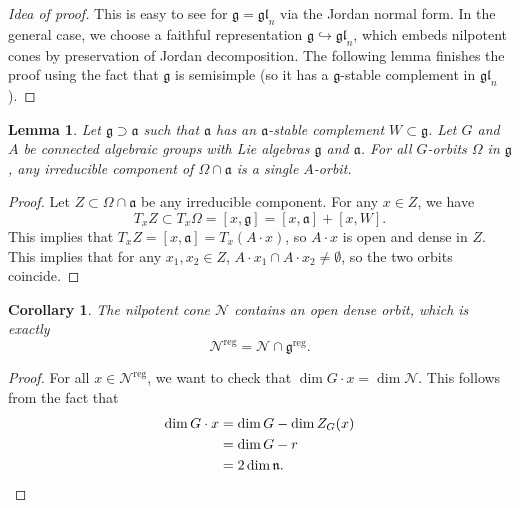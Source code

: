 \documentclass{amsart}
\newtheorem{cor}[thm]{Corollary}
\newtheorem{lem}[thm]{Lemma}
\theoremstyle{definition}
\theoremstyle{remark}
\theoremstyle{plain}
\theoremstyle{definition}
\theoremstyle{remark}
\newcommand{\g}{\mathfrak{g}}
\newcommand{\n}{\mathfrak{n}}
\newcommand{\mc}[1]{\mathcal{#1}}
\newcommand{\mf}[1]{\mathfrak{#1}}
\newcommand{\on}[1]{\operatorname{#1}}
\newcommand{\1}{\mathbf{1}}
\newcommand{\2}{\mathbf{2}}
\newcommand{\3}{\mathbf{3}}
\newcommand{\gl}{\mf{gl}}
\begin{document}
\begin{proof}[Idea of proof]
    This is easy to see for \(\g = \gl_n\) via the Jordan normal form. In the general case, we choose a faithful representation \(\g \hookrightarrow \gl_n\), which embeds nilpotent cones by preservation of Jordan decomposition. The following lemma finishes the proof using the fact that \(\g\) is semisimple (so it has a \(\g\)-stable complement in \(\gl_n\)).
\end{proof}
\begin{lem}
    Let \(\g \supset \mf{a}\) such that \(\mf{a}\) has an \(\mf{a}\)-stable complement \(W \subset \g\). Let \(G\) and \(A\) be connected algebraic groups with Lie algebras \(\g\) and \(\mf{a}\). For all \(G\)-orbits \(\Omega\) in \(\g\), any irreducible component of \(\Omega \cap \mf{a}\) is a single \(A\)-orbit.
\end{lem}
\begin{proof}
    Let \(Z \subset \Omega \cap \mf{a}\) be any irreducible component. For any \(x \in Z\), we have
    \[ T_x Z \subset T_x \Omega = [x, \g] = [x, \mf{a}] + [x, W]. \]
    This implies that \(T_x Z = [x, \mf{a}] = T_x (A \cdot x)\), so \(A \cdot x\) is open and dense in \(Z\). This implies that for any \(x_1, x_2 \in Z\), \(A \cdot x_1 \cap A \cdot x_2 \neq \emptyset\), so the two orbits coincide. 
\end{proof}

\begin{cor}
    The nilpotent cone \(\mc{N}\) contains an open dense orbit, which is exactly
    \[ \mc{N}^{\on{reg}} = \mc{N} \cap \g^{\on{reg}}. \]
\end{cor}

\begin{proof}
    For all \(x \in \mc{N}^{\on{reg}}\), we want to check that \(\dim G \cdot x = \dim \mc{N}\). This follows from the fact that
    \begin{align*}
        \dim G \cdot x &= \dim G - \dim Z_G(x) \\
        &= \dim G - r \\
        &= 2 \dim \n. \qedhere
    \end{align*}
\end{proof}
\end{document}

